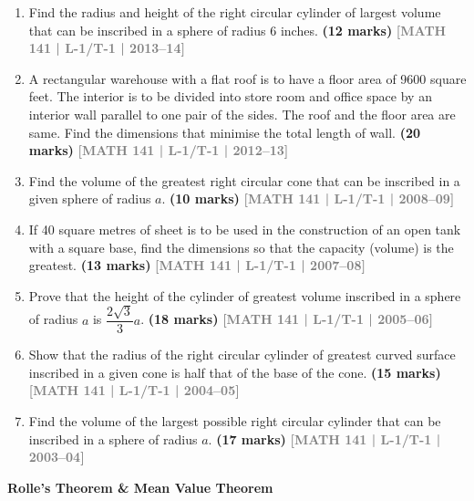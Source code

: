 \documentclass[12pt,a3paper]{article}
\newcommand{\yr}[1]{\hfill\textcolor{gray}{\small\textbf{[#1]}}}
\newcommand{\mk}[1]{\textcolor{orange!70!black}{\small\textbf{(#1 marks)}}}
\newcommand{\subtopic}[2]{%
  \vspace{10pt}
  \noindent\begin{tcolorbox}[colback=#1!8,colframe=#1,boxrule=0.6pt,arc=4pt,
    left=6pt,right=6pt,top=4pt,bottom=4pt]
    \small\bfseries\textcolor{#1}{#2}
  \end{tcolorbox}
  \vspace{2pt}
}
\begin{document}
\begin{enumerate}
\item Find the radius and height of the right circular cylinder of largest volume that can be inscribed in a sphere of radius 6 inches.
\mk{12} \yr{MATH 141 | L-1/T-1 | 2013--14}

\item A rectangular warehouse with a flat roof is to have a floor area of 9600 square feet. The interior is to be divided into store room and office space by an interior wall parallel to one pair of the sides. The roof and the floor area are same. Find the dimensions that minimise the total length of wall.
\mk{20} \yr{MATH 141 | L-1/T-1 | 2012--13}

\item Find the volume of the greatest right circular cone that can be inscribed in a given sphere of radius $a$.
\mk{10} \yr{MATH 141 | L-1/T-1 | 2008--09}

\item If 40 square metres of sheet is to be used in the construction of an open tank with a square base, find the dimensions so that the capacity (volume) is the greatest.
\mk{13} \yr{MATH 141 | L-1/T-1 | 2007--08}

\item Prove that the height of the cylinder of greatest volume inscribed in a sphere of radius $a$ is $\dfrac{2\sqrt{3}}{3}a$.
\mk{18} \yr{MATH 141 | L-1/T-1 | 2005--06}

\item Show that the radius of the right circular cylinder of greatest curved surface inscribed in a given cone is half that of the base of the cone.
\mk{15} \yr{MATH 141 | L-1/T-1 | 2004--05}

\item Find the volume of the largest possible right circular cylinder that can be inscribed in a sphere of radius $a$.
\mk{17} \yr{MATH 141 | L-1/T-1 | 2003--04}

\end{enumerate}

\subtopic{cA}{Rolle's Theorem \& Mean Value Theorem}
\label{sub:s1-rolle}
\end{document}
